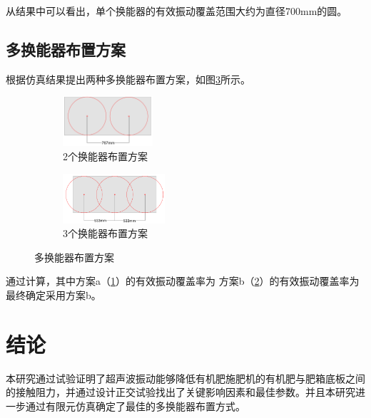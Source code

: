 \documentclass[fontset=windows,12pt,a4paper,titlepage,UTF8]{ctexart}
\begin{document}
从结果中可以看出，单个换能器的有效振动覆盖范围大约为直径700mm的圆。

\subsection{多换能器布置方案}

根据仿真结果提出两种多换能器布置方案，如图\ref{pic:多换能器布置方案}所示。

\begin{figure}[h]
  \centering
  \begin{subfigure}{0.4\textwidth}
    \centering
    \includegraphics[height=5em]{assets/2transducer.pdf}
    \caption{2个换能器布置方案}
    \label{pic:2个换能器布置方案}
  \end{subfigure}
  \hfill
  \begin{subfigure}{0.5\textwidth}
    \centering
    \includegraphics[height=5em]{assets/3transducer.pdf}
    \caption{3个换能器布置方案}
    \label{pic:3个换能器布置方案}
  \end{subfigure}
  \caption{多换能器布置方案}
  \label{pic:多换能器布置方案}
\end{figure}

通过计算，其中方案a（\ref{pic:2个换能器布置方案}）的有效振动覆盖率为%
方案b（\ref{pic:3个换能器布置方案}）的有效振动覆盖率为%
最终确定采用方案b。

\section{结论}

本研究通过试验证明了超声波振动能够降低有机肥施肥机的有机肥与肥箱底板之间的接触阻力，并通过设计正交试验找出了关键影响因素和最佳参数。并且本研究进一步通过有限元仿真确定了最佳的多换能器布置方式。
\end{document}
